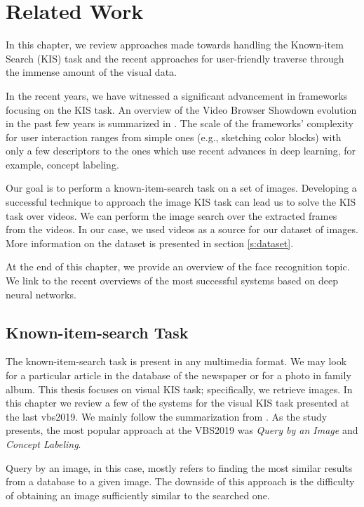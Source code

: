 \chapter{Related Work}
\label{ch:related_work}


In this chapter, we review approaches made towards handling the Known-item Search (KIS) task and the recent approaches for user-friendly traverse through the immense amount of the visual data.

In the recent years, we have witnessed a significant advancement in frameworks focusing on the KIS task. An overview of the Video Browser Showdown evolution in the past few years is summarized in \citep{lokovc2018influential}. The scale of the frameworks' complexity for user interaction ranges from simple ones (e.g., sketching color blocks) with only a few descriptors to the ones which use recent advances in deep learning, for example, concept labeling.

Our goal is to perform a known-item-search task on a set of images. Developing a successful technique to approach the image KIS task can lead us to solve the KIS task over videos. We can perform the image search over the extracted frames from the videos. In our case, we used videos as a source for our dataset of images. More information on the dataset is presented in section \ref{s:dataset}.

At the end of this chapter, we provide an overview of the face recognition topic. We link to the recent overviews of the most successful systems based on deep neural networks.

\section{Known-item-search Task}

The known-item-search task is present in any multimedia format. We may look for a particular article in the database of the newspaper or for a photo in family album. This thesis focuses on visual KIS task; specifically, we retrieve images. In this chapter we review a few of the systems for the visual KIS task presented at the last \acrshort{vbs}2019. We mainly follow the summarization from \cite{rossetto2020interactive}. As the study presents, the most popular approach at the VBS2019 was \emph{Query by an Image} and \emph{Concept Labeling}. 

Query by an image, in this case, mostly refers to finding the most similar results from a database to a given image. The downside of this approach is the difficulty of obtaining an image sufficiently similar to the searched one.

